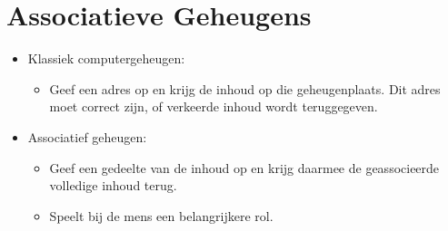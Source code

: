 \chapter{Associatieve Geheugens}
\begin{itemize}
    \item Klassiek computergeheugen:
    \begin{itemize}
        \item Geef een adres op en krijg de inhoud op die geheugenplaats.
        \alert Dit adres moet correct zijn, of verkeerde inhoud wordt teruggegeven.
    \end{itemize}
    \item Associatief geheugen:
    \begin{itemize}
        \item Geef een gedeelte van de inhoud op en krijg daarmee de geassocieerde volledige inhoud terug.
        \item Speelt bij de mens een belangrijkere rol. 
    \end{itemize}

\end{itemize}
